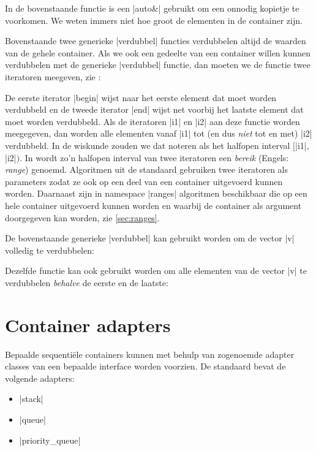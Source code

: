 \begin{cpplstShortInline}
In de bovenstaande functie is een |auto&| gebruikt om een onnodig kopietje te voorkomen.
We weten immers niet hoe groot de elementen in de container zijn.

Bovenstaande twee generieke |verdubbel| functies verdubbelen altijd de waarden van de gehele container.
Als we ook een gedeelte van een container willen kunnen verdubbelen met de generieke |verdubbel| functie, dan moeten we de functie twee iteratoren meegeven, zie :


De eerste iterator |begin| wijst naar het eerste element dat moet worden verdubbeld en de tweede iterator |end| wijst net voorbij het laatste element dat moet worden verdubbeld.
Als de iteratoren |i1| en |i2| aan deze functie worden meegegeven, dan worden alle elementen vanaf |i1| tot (en dus \emph{niet} tot en met) |i2| verdubbeld.
In de wiskunde zouden we dat noteren als het halfopen interval $[$|i1|$, $|i2|$)$.
In \Cpp{} wordt zo'n halfopen interval van twee iteratoren een \emph{bereik} (Engels: \emph{range}) genoemd.
Algoritmen uit de standaard \Cpp{}  gebruiken twee iteratoren als parameters zodat ze ook op een deel van een container uitgevoerd kunnen worden.
Daarnaast zijn in namespace |ranges| algoritmen beschikbaar die op een hele container uitgevoerd kunnen worden en waarbij de container als argument doorgegeven kan worden, zie \cref{sec:ranges}.

De bovenstaande generieke |verdubbel| kan gebruikt worden om de vector |v| volledig te verdubbelen:

Dezelfde functie kan ook gebruikt worden om alle elementen van de vector |v| te verdubbelen \emph{behalve} de eerste en de laatste:

\section{Container adapters}
Bepaalde sequentiële containers kunnen met behulp van zogenoemde adapter classes van een bepaalde interface worden voorzien.
De standaard \Cpp{}  bevat de volgende adapters:
\begin{itemize}
	\item |stack|
	\item |queue|
	\item |priority_queue|
\end{itemize}


\end{cpplstShortInline}
